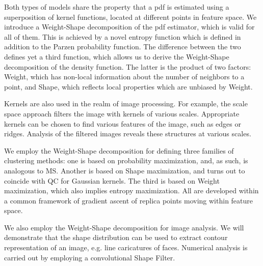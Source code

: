 \documentclass[preprint,12pt]{elsarticle}
\begin{document}
Both types of models share the property that a pdf is estimated using a superposition of kernel functions, located at different points in feature space. We introduce a Weight-Shape decomposition of the pdf estimator, which is valid for all of them. This is achieved by a novel entropy function which is defined in addition to the Parzen probability function. The difference between the two defines yet a third function, which allows us to derive the Weight-Shape decomposition of the density function. The latter is the product of two factors: Weight, which has non-local information about the number of neighbors to a point, and Shape, which reflects local properties which are unbiased by Weight.

Kernels are also used in the realm of image processing. For example, the scale space approach \cite{witkin1984} filters the image with kernels of various scales. Appropriate kernels can be chosen to find various features of the image, such as edges or ridges. Analysis of the filtered images reveals these structures at various scales.

We employ the Weight-Shape decomposition for defining three families of clustering methods: one is based on probability maximization, and, as such, is analogous to MS. Another is based on Shape maximization, and turns out to coincide with QC for Gaussian kernels. The third is based on Weight maximization, which also implies entropy maximization. All are developed within a common framework of gradient ascent of replica points moving within feature space.

We also employ the Weight-Shape decomposition for image analysis. We will demonstrate that the shape distribution can be used to extract contour representation of an image, e.g. line caricatures of faces. Numerical analysis is carried out by employing a convolutional Shape Filter.
\end{document}
